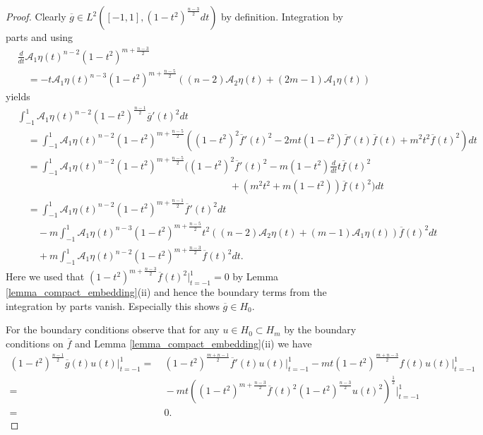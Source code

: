 \documentclass[12pt,twoside]{amsart}
\numberwithin{satz}{section}
\theoremstyle{definition}
\numberwithin{equation}{section}
\begin{document}
	\begin{proof}
		Clearly $\overline{g}\in L^2([-1,1],(1-t^2)^{\frac{n-3}{2}}dt)$ by definition. Integration by parts and using 
		\begin{align*}
			&\frac{d}{dt}\mathcal{A}_1\eta(t)^{n-2}(1-t^2)^{m+\frac{n-3}{2}}\\
			& \quad =-t\mathcal{A}_1\eta(t)^{n-3}(1-t^2)^{m+\frac{n-5}{2}}\left((n-2)\mathcal{A}_2\eta(t)+(2m-1)\mathcal{A}_1\eta(t)\right)
		\end{align*}
		yields 	
		\begin{align*}
			&\int_{-1} ^1 \mathcal{A}_1\eta(t)^{n-2}(1-t^2)^{\frac{n-1}{2}}\overline{g}'(t)^2dt \\
			&\quad = \int_{-1} ^1 \mathcal{A}_1\eta(t)^{n-2}(1-t^2)^{m+\frac{n-5}{2}}\left((1-t^2)^2\overline{f}'(t)^2-2mt(1-t^2)\overline{f}'(t)\overline{f}(t)+m^2t^2\overline{f}(t)^2\right)dt\\
			& \quad = \int_{-1} ^1 \mathcal{A}_1\eta(t)^{n-2}(1-t^2)^{m+\frac{n-5}{2}}\bigg((1-t^2)^2\overline{f}'(t)^2-m(1-t^2)\frac{d}{dt}t\overline{f}(t)^2\\
			& \hspace{9cm} +\left(m^2t^2+m(1-t^2)\right)\overline{f}(t)^2\bigg)dt \\
			& \quad = \int_{-1}^1 \mathcal{A}_1\eta(t)^{n-2}(1-t^2)^{m+\frac{n-1}{2}}\overline{f}'(t)^2 dt \\
			& \quad \quad -m\int_{-1}^1 \mathcal{A}_1\eta(t)^{n-3} (1-t^2)^{m+\frac{n-5}{2}} t^2 \left((n-2)\mathcal{A}_2\eta(t)+(m-1)\mathcal{A}_1\eta(t)\right) \overline{f}(t)^2dt \\
			& \quad \quad + m \int_{-1} ^1\mathcal{A}_1\eta(t)^{n-2}(1-t^2)^{m+\frac{n-3}{2}}\overline{f}(t)^2dt.
		\end{align*} 
		Here we used that $(1-t^2)^{m+\frac{n-3}{2}}\overline{f}(t)^2\big|_{t=-1}^1=0$ by Lemma \ref{lemma_compact_embedding}(ii) and hence the boundary terms from the integration by parts vanish. Especially this shows $\overline{g}\in H_0$.
		
		For the boundary conditions observe that for any $u\in H_0\subset H_m$ by the boundary conditions on $\overline{f}$ and Lemma \ref{lemma_compact_embedding}(ii) we have
		\begin{align*}
			(1-t^2)^{\frac{n-1}{2}}\overline{g}(t)u(t)\big|_{t=-1}^1=& \ (1-t^2)^{\frac{m+n-1}{2}}\overline{f}'(t)u(t)\big|_{t=-1}^1 - mt(1-t^2)^{\frac{m+n-3}{2}}f(t)u(t)\big|_{t=-1}^1 \\
			=& \ -mt \left((1-t^2)^{m+\frac{n-3}{2}}\overline{f}(t)^2(1-t^2)^{\frac{n-3}{2}}u(t)^2\right)^{\frac{1}{2}}\big|_{t=-1}^1 \\
			=& \ 0.
		\end{align*}
		

\end{proof}
\end{document}
